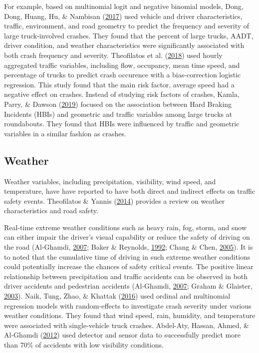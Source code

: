 \documentclass[12pt]{book}
\numberwithin{equation}{chapter}
\begin{document}
For example, based on multinomial logit and negative binomial models, Dong, Dong, Huang, Hu, \& Nambisan (\protect\hyperlink{ref-dong2017estimating}{2017}) used vehicle and driver characteristics, traffic, environment, and road geometry to predict the frequency and severity of large truck-involved crashes. They found that the percent of large trucks, AADT, driver condition, and weather characteristics were significantly associated with both crash frequency and severity. Theofilatos et al. (\protect\hyperlink{ref-theofilatos2018impact}{2018}) used hourly aggregated traffic variables, including flow, occupancy, mean time speed, and percentage of trucks to predict crash occurence with a bias-correction logistic regression. This study found that the main risk factor, average speed had a negative effect on crashes. Instead of studying risk factors of crashes, Kamla, Parry, \& Dawson (\protect\hyperlink{ref-kamla2019analysing}{2019}) focused on the association between Hard Braking Incidents (HBIs) and geometric and traffic variables among large trucks at roundabouts. They found that HBIs were influenced by traffic and geometric variables in a similar fashion as crashes.

\hypertarget{weather}{%
\subsection{Weather}\label{weather}}

Weather variables, including precipitation, visibility, wind speed, and temperature, have have reported to have both direct and indirect effects on traffic safety events. Theofilatos \& Yannis (\protect\hyperlink{ref-theofilatos2014review}{2014}) provides a review on weather characteristics and road safety.

Real-time extreme weather conditions such as heavy rain, fog, storm, and snow can either impair the driver's visual capability or reduce the safety of driving on the road (Al-Ghamdi, \protect\hyperlink{ref-al2007experimental}{2007}; Baker \& Reynolds, \protect\hyperlink{ref-baker1992wind}{1992}; Chang \& Chen, \protect\hyperlink{ref-chang2005data}{2005}). It is to noted that the cumulative time of driving in such extreme weather conditions could potentially increase the chances of safety critical events. The positive linear relationship between precipitation and traffic accidents can be observed in both driver accidents and pedestrian accidents (Al-Ghamdi, \protect\hyperlink{ref-al2007experimental}{2007}; Graham \& Glaister, \protect\hyperlink{ref-graham2003spatial}{2003}). Naik, Tung, Zhao, \& Khattak (\protect\hyperlink{ref-naik2016weather}{2016}) used ordinal and multinomial regression models with random-effects to investigate crash severity under various weather conditions. They found that wind speed, rain, humidity, and temperature were associated with single-vehicle truck crashes. Abdel-Aty, Hassan, Ahmed, \& Al-Ghamdi (\protect\hyperlink{ref-abdel2012real}{2012}) used detector and sensor data to successfully predict more than 70\% of accidents with low visibility conditions.
\end{document}
